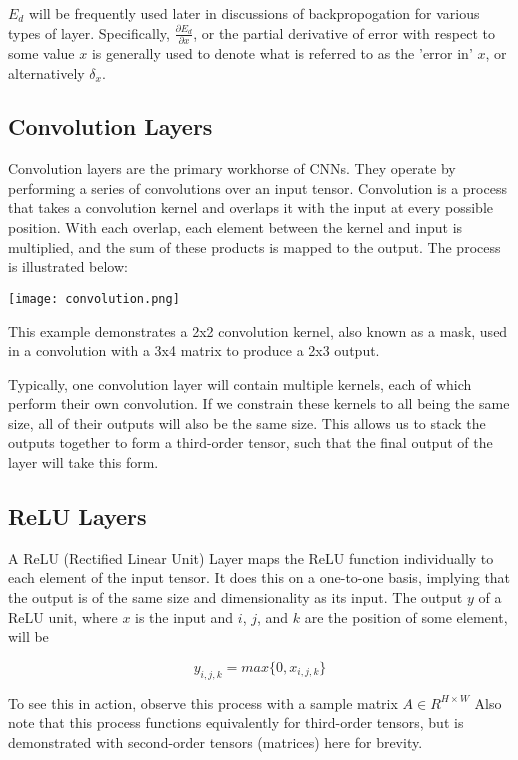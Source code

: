 \documentclass[a4paper, 11pt]{article} %
\begin{document}
$E_{d}$ will be frequently used later in discussions of backpropogation for various types of layer.  Specifically, $\frac{\partial E_{d}}{\partial x}$, or the partial derivative of error with respect to some value $x$ is generally used to denote what is referred to as the 'error in' $x$, or alternatively $\delta_x$.

\subsection*{Convolution Layers}

Convolution layers are the primary workhorse of CNNs.  They operate by performing a series of convolutions over an input tensor.  Convolution is a process that takes a convolution kernel and overlaps it with the input at every possible position.  With each overlap, each element between the kernel and input is multiplied, and the sum of these products is mapped to the output.  The process is illustrated below:

\texttt{[image: convolution.png]}

This example demonstrates a 2x2 convolution kernel, also known as a mask, used in a convolution with a 3x4 matrix to produce a 2x3 output.

Typically, one convolution layer will contain multiple kernels, each of which perform their own convolution.  If we constrain these kernels to all being the same size, all of their outputs will also be the same size.  This allows us to stack the outputs together to form a third-order tensor, such that the final output of the layer will take this form.

\subsection*{ReLU Layers}

A ReLU (Rectified Linear Unit) Layer maps the ReLU function individually to each element of the input tensor.  It does this on a one-to-one basis, implying that the output is of the same size and dimensionality as its input.  The output $y$ of a ReLU unit, where $x$ is the input and $i$, $j$, and $k$ are the position of some element, will be

\begin{equation}
y_{i,j,k} = max\{0, x_{i,j,k}\}
\end{equation}

To see this in action, observe this process with a sample matrix $A \in R^{H \times W}$  Also note that this process functions equivalently for third-order tensors, but is demonstrated with second-order tensors (matrices) here for brevity.
\end{document}
